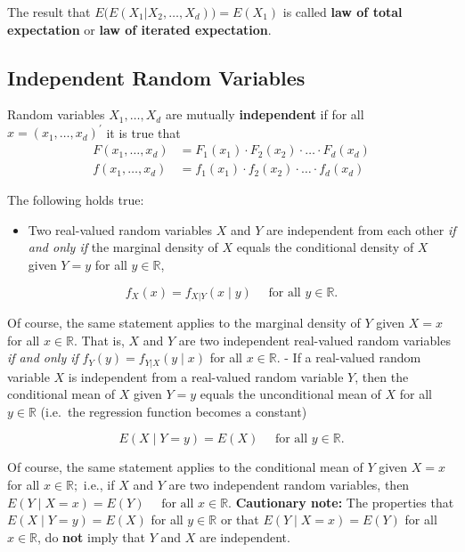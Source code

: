 \documentclass[
  letterpaper,
  DIV=11,
  numbers=noendperiod]{scrreprt}
\providecommand{\tightlist}{%
  \setlength{\itemsep}{0pt}\setlength{\parskip}{0pt}}\usepackage{longtable,booktabs,array}
\theoremstyle{definition}
\theoremstyle{plain}
\theoremstyle{plain}
\theoremstyle{remark}
\begin{document}
The result that \(E\big(E(X_1|X_2,\ldots,X_d)\big)=E(X_1)\) is called
\textbf{law of total expectation} or \textbf{law of iterated
expectation}.

\hypertarget{independent-random-variables}{%
\subsection{Independent Random
Variables}\label{independent-random-variables}}

Random variables \(X_1,\dots,X_d\) are mutually \textbf{independent} if
for all \(x=(x_1,\dots,x_d)^\prime\) it is true that \begin{align*}
  F(x_1,\dots,x_d)&=F_1(x_1)\cdot F_2(x_2)\cdot\ldots\cdot F_d(x_d)\\
  f(x_1,\dots,x_d)&=f_1(x_1)\cdot f_2(x_2)\cdot\ldots\cdot f_d(x_d)
\end{align*}

The following holds true:

\begin{itemize}
\tightlist
\item
  Two real-valued random variables \(X\) and \(Y\) are independent from
  each other \textit{if and only if} the marginal density of \(X\)
  equals the conditional density of \(X\) given \(Y=y\) for all
  \(y\in\mathbb{R}\),
\end{itemize}

\[f_X(x)=f_{X|Y}(x\mid y)\quad \text{ for all } y\in\mathbb{R}.\]

Of course, the same statement applies to the marginal density of \(Y\)
given \(X=x\) for all \(x\in\mathbb{R}\). That is, \(X\) and \(Y\) are
two independent real-valued random variables \textit{if and only if}
\(f_Y(y)=f_{Y|X}(y\mid x)\) for all \(x\in\mathbb{R}.\) - If a
real-valued random variable \(X\) is independent from a real-valued
random variable \(Y\), then the conditional mean of \(X\) given \(Y=y\)
equals the unconditional mean of \(X\) for all \(y\in\mathbb{R}\)
(i.e.~the regression function becomes a constant)

\[E(X\mid Y=y)=E(X)\quad \text{ for all } y\in\mathbb{R}.\]

Of course, the same statement applies to the conditional mean of \(Y\)
given \(X=x\) for all \(x\in\mathbb{R};\) i.e., if \(X\) and \(Y\) are
two independent random variables, then
\(E(Y\mid X=x)=E(Y)\quad \text{ for all } x\in\mathbb{R}.\)\newline
\textbf{Cautionary note:} The properties that \(E(X\mid Y=y)=E(X)\) for
all \(y\in\mathbb{R}\) or that \(E(Y\mid X=x)=E(Y)\) for all
\(x\in\mathbb{R}\), do \textbf{not} imply that \(Y\) and \(X\) are
independent.
\end{document}
